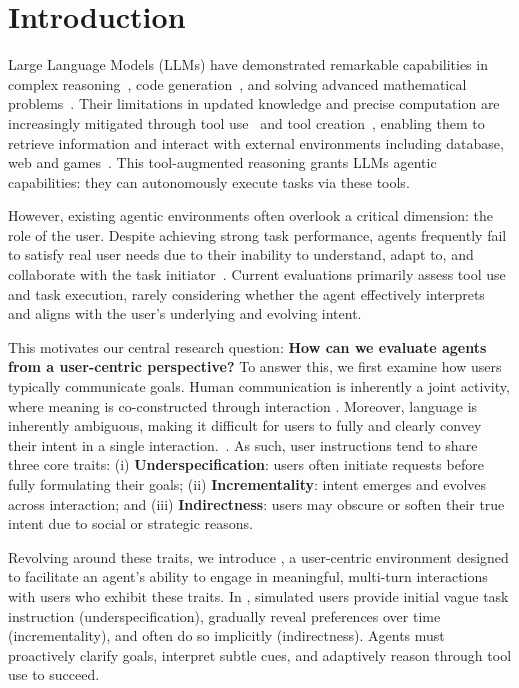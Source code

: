 \section{Introduction}

Large Language Models (LLMs) have demonstrated remarkable capabilities in complex reasoning~\citep{jaech2024openai, guo2025deepseek}, code generation~\citep{hui2024qwen2, guo2024deepseek,zhang2024diversity}, and solving advanced mathematical problems~\citep{yang2024qwen2, shao2024deepseekmath, qian2025modelingagent}. Their limitations in updated knowledge and precise computation are increasingly mitigated through tool use~\citep{liu2024apigen, qian2024investigate, zhang2024xlam, prabhakar2025apigen} and tool creation~\citep{qian2023creator, cai2023large, yuan2024craft, qian2024toolink}, enabling them to retrieve information and interact with external environments including database, web and games~\citep{deng2024mind2web, qian2024escapebench, zhu2025multiagentbench}. This tool-augmented reasoning grants LLMs agentic capabilities: they can autonomously execute tasks via these tools.

However, existing agentic environments often overlook a critical dimension: the role of the user. Despite achieving strong task performance, agents frequently fail to satisfy real user needs due to their inability to understand, adapt to, and collaborate with the task initiator~\citep{qian2024tell, lu2025proactive}. Current evaluations primarily assess tool use and task execution, rarely considering whether the agent effectively interprets and aligns with the user’s underlying and evolving intent.

This motivates our central research question: \textbf{How can we evaluate agents from a user-centric perspective?} To answer this, we first examine how users typically communicate goals. Human communication is inherently a joint activity, where meaning is co-constructed through interaction \citep{clark1996using}. Moreover, language is inherently ambiguous, making it difficult for users to fully and clearly convey their intent in a single interaction.~\citep{liu2023we}. As such, user instructions tend to share three core traits:
(i) \textbf{Underspecification}: users often initiate requests before fully formulating their goals;
(ii) \textbf{Incrementality}: intent emerges and evolves across interaction; and
(iii) \textbf{Indirectness}: users may obscure or soften their true intent due to social or strategic reasons.

Revolving around these traits, we introduce \textbf{{\gymname}}, a user-centric environment designed to facilitate an agent’s ability to engage in meaningful, multi-turn interactions with users who exhibit these traits. In {\gymname}, simulated users provide initial vague task instruction (underspecification), gradually reveal preferences over time (incrementality), and often do so implicitly (indirectness). Agents must proactively clarify goals, interpret subtle cues, and adaptively reason through tool use to succeed.

